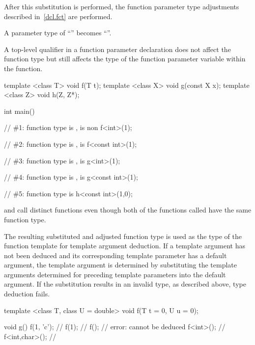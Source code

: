 \pnum
After this substitution is performed, the function parameter type
adjustments described in~\ref{dcl.fct} are performed.
\begin{example}
A parameter type of ``'' becomes
``''.
\end{example}
\begin{note}
A top-level qualifier in a function parameter declaration does not affect
the function type but still affects the type of the function parameter
variable within the function.
\end{note}
\begin{example}

\begin{codeblock}
template <class T> void f(T t);
template <class X> void g(const X x);
template <class Z> void h(Z, Z*);

int main() {
  // \#1: function type is ,  is non 
  f<int>(1);

  // \#2: function type is ,  is 
  f<const int>(1);

  // \#3: function type is ,  is 
  g<int>(1);

  // \#4: function type is ,  is 
  g<const int>(1);

  // \#5: function type is 
  h<const int>(1,0);
}
\end{codeblock}
\end{example}

\pnum
\begin{note}
 and  call distinct functions
even though both of the functions called have the same function type.
\end{note}

\pnum
The resulting substituted and adjusted function type is used as
the type of the function template for template argument
deduction.  If a template argument has not been deduced and its
corresponding template parameter has a default argument, the
template argument is determined by substituting the template
arguments determined for preceding template parameters into the
default argument. If the substitution results in an invalid type,
as described above, type deduction fails.
\begin{example}
\begin{codeblock}
template <class T, class U = double>
void f(T t = 0, U u = 0);

void g() {
  f(1, 'c');        // 
  f(1);             // 
  f();              // error:  cannot be deduced
  f<int>();         // 
  f<int,char>();    // 
}
\end{codeblock}
\end{example}

